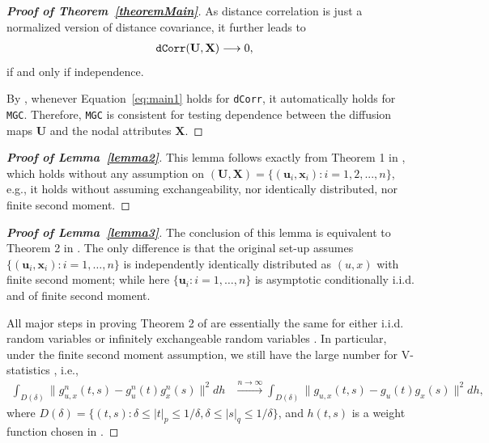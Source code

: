 \documentclass[12pt]{article}
\theoremstyle{definition}
\begin{document}
\begin{proof}[\textbf{Proof of Theorem~\ref{theoremMain}}]
		As distance correlation is just a normalized version of distance covariance, it further leads to
		\begin{eqnarray}
			\mbox{\texttt{dCorr}}(\mathbf{U},\mathbf{X}) &\longrightarrow 0,
			\label{eq:main1}
		\end{eqnarray}
		if and only if independence.
		
		By \cite{shen2016discovering}, whenever Equation~\ref{eq:main1} holds for \texttt{dCorr}, it automatically holds for \texttt{MGC}. Therefore, \texttt{MGC} is consistent for testing dependence between the diffusion maps $\mathbf{U}$ and the nodal attributes $\mathbf{X}$.
	\end{proof}
	
	\begin{proof}[\textbf{Proof of Lemma~\ref{lemma2}}] 
		This lemma follows exactly from Theorem 1 in \cite{szekely2007measuring}, which holds without any assumption on $(\mathbf{U}, \mathbf{X} ) =  \{(\mathbf{u}_{i},\mathbf{x}_{i}) :  i=1,2,...,n\}$, e.g., it holds without assuming exchangeability, nor identically distributed, nor finite second moment.
	\end{proof}
	
	\begin{proof}[\textbf{Proof of Lemma~\ref{lemma3}}] 
		The conclusion of this lemma is equivalent to Theorem 2 in \cite{szekely2007measuring}. The only difference is that the original set-up assumes $\{(\mathbf{u}_{i},\mathbf{x}_{i}) : i = 1, \ldots , n \}$ is independently identically distributed as $(u,x)$ with finite second moment; while here $\{  \mathbf{u}_{i} : i = 1, \ldots, n  \}$ is asymptotic conditionally i.i.d. and of finite second moment.
		
		All major steps in proving Theorem 2 of \cite{szekely2007measuring} are essentially the same for either i.i.d. random variables or infinitely exchangeable random variables \citep{InoueTaylor2006}. In particular, under the finite second moment assumption, we still have the large number for V-statistics \citep{KoroljukBook}, i.e., 
		\begin{eqnarray}
			\displaystyle\int_{D(\delta)}{\|g_{u,x}^{n}(t,s)-g_{u}^{n}(t)g_{x}^{n}(s)\|^{2}}dh &\stackrel{n \rightarrow \infty}{\longrightarrow} 
			\displaystyle\int_{D(\delta)}{\|g_{u,x}(t,s)-g_{u}(t)g_{x}(s)\|^{2}}dh,
			\label{eq:SLLN}
		\end{eqnarray}
		where $D(\delta)=\{(t,s):\delta \leq |t|_{p} \leq 1/\delta,\delta \leq |s|_{q} \leq 1/\delta\}$, and $h(t,s)$ is a weight function chosen in \cite{szekely2007measuring}. 
	\end{proof}
	
\end{document}

